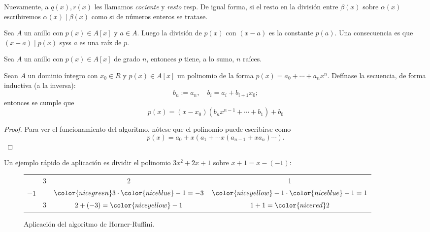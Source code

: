 \documentclass[11pt,oneside]{book}
\begin{document}
Nuevamente, a $q(x),r(x)$ les llamamos \textit{cociente} y \textit{resto} resp. De igual forma, si el resto en la división entre $\beta(x)$ sobre $\alpha(x)$ escribiremos $\alpha(x)\mid\beta(x)$ como si de números enteros se tratase.
\begin{thm}
Sea $A$ un anillo con $p(x)\in A[x]$ y $a\in A$. Luego la división de $p(x)$ con $(x-a)$ es la constante $p(a)$. Una consecuencia es que $(x-a)\mid p(x)$ syss $a$ es una raíz de $p$.
\end{thm}
\begin{thm}\label{thm:polynomials-max-roots}
Sea $A$ un anillo con $p(x)\in A[x]$ de grado $n$, entonces $p$ tiene, a lo sumo, $n$ raíces.
\end{thm}
\begin{thm}
Sean $A$ un dominio íntegro con $x_0\in R$ y $p(x)\in A[x]$ un polinomio de la forma $p(x)=a_0+\cdots+a_nx^n$. Defínase la secuencia, de forma inductiva (a la inversa):
$$b_n:=a_n,\quad b_i=a_i+b_{i+1}x_0;$$
entonces se cumple que
$$p(x)=(x-x_0)(b_nx^{n-1}+\cdots+b_1)+b_0$$
\end{thm}
\begin{proof}
Para ver el funcionamiento del algoritmo, nótese que el polinomio puede escribirse como
$$p(x)=a_0+x(a_1+\cdots x(a_{n-1}+xa_n)\cdots).$$
\end{proof}
Un ejemplo rápido de aplicación es dividir el polinomio $3x^2+2x+1$ sobre $x+1=x-(-1)$:
\begin{figure}
\centering
\begin{tabular}{c|ccc}
& 3 & 2 & 1\\
{\color{niceblue}$-1$} & & ${\color{nicegreen}3}\cdot{\color{niceblue}-1}=-3$ & ${\color{niceyellow}-1}\cdot{\color{niceblue}-1}=1$\\ \hline
& {\color{nicegreen}3} & $2+(-3)={\color{niceyellow}-1}$ & $1+1={\color{nicered}2}$ 
\end{tabular}
\caption{Aplicación del algoritmo de Horner-Ruffini.}
\end{figure}
\end{document}

